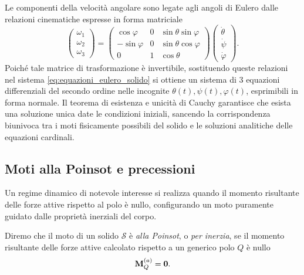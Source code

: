 Le componenti della velocità angolare sono legate agli angoli di Eulero dalle relazioni cinematiche espresse in forma matriciale
\begin{equation*}
    \begin{pmatrix}
        \omega_1 \\
        \omega_2 \\
        \omega_3
    \end{pmatrix} =
    \begin{pmatrix}
        \cos\varphi & 0 & \sin\theta \sin\varphi \\
        -\sin\varphi & 0 & \sin\theta \cos\varphi  \\
        0 & 1 & \cos\theta
    \end{pmatrix}
    \begin{pmatrix}
        \dot{\theta} \\
        \dot{\psi} \\
        \dot{\varphi}
    \end{pmatrix}.
\end{equation*}
Poiché tale matrice di trasformazione è invertibile, sostituendo queste relazioni nel sistema \eqref{eq:equazioni_eulero_solido} si ottiene un sistema di 3 equazioni differenziali del secondo ordine nelle incognite $\theta(t), \psi(t), \varphi(t)$, esprimibili in forma normale. Il teorema di esistenza e unicità di Cauchy garantisce che esista una soluzione unica date le condizioni iniziali, sancendo la corrispondenza biunivoca tra i moti fisicamente possibili del solido e le soluzioni analitiche delle equazioni cardinali.

\subsection{Moti alla Poinsot e precessioni}
Un regime dinamico di notevole interesse si realizza quando il momento risultante delle forze attive rispetto al polo è nullo, configurando un moto puramente guidato dalle proprietà inerziali del corpo.

\begin{definition}
    Diremo che il moto di un solido $\mathcal{S}$ è \emph{alla Poinsot}, o \emph{per inerzia}, se il momento risultante delle forze attive calcolato rispetto a un generico polo $Q$ è nullo
    \begin{equation*}
        \vb{M}_Q^{(a)} = \vb{0}.
    \end{equation*}
\end{definition}


